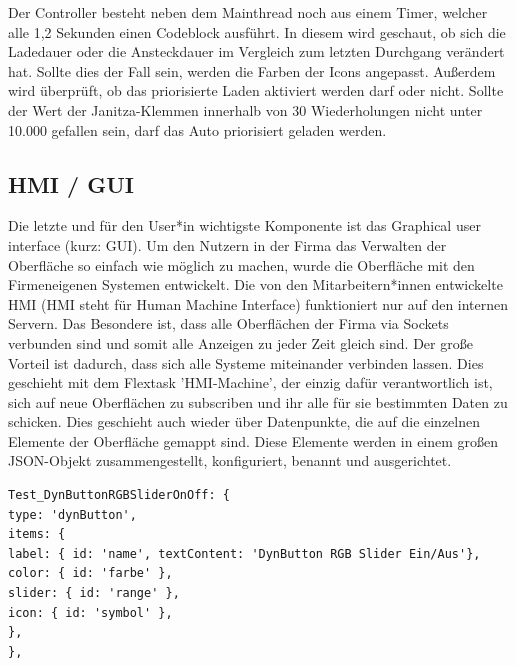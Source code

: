 Der Controller besteht neben dem Mainthread noch aus einem Timer, welcher alle 1,2 Sekunden einen Codeblock ausführt. In diesem wird geschaut, ob sich die Ladedauer oder die Ansteckdauer im Vergleich zum letzten Durchgang verändert hat. Sollte dies der Fall sein, werden die Farben der Icons angepasst. Außerdem wird überprüft, ob das priorisierte Laden aktiviert werden darf oder nicht. Sollte der Wert der Janitza-Klemmen innerhalb von 30 Wiederholungen nicht unter 10.000 gefallen sein, darf das Auto priorisiert geladen werden.


\subsection{HMI / GUI} 
Die letzte und für den User*in wichtigste Komponente ist das Graphical user interface (kurz: GUI). Um den Nutzern in der Firma das Verwalten der Oberfläche so einfach wie möglich zu machen, wurde die Oberfläche mit den Firmeneigenen Systemen entwickelt. Die von den Mitarbeitern*innen entwickelte HMI (HMI steht für Human Machine Interface) funktioniert nur auf den internen Servern. Das Besondere ist, dass alle Oberflächen der Firma via Sockets verbunden sind und somit alle Anzeigen zu jeder Zeit gleich sind. Der große Vorteil ist dadurch, dass sich alle Systeme miteinander verbinden lassen. Dies geschieht mit dem Flextask 'HMI-Machine', der einzig dafür verantwortlich ist, sich auf neue Oberflächen zu subscriben und ihr alle für sie bestimmten Daten zu schicken. Dies geschieht auch wieder über Datenpunkte, die auf die einzelnen Elemente der Oberfläche gemappt sind. Diese Elemente werden in einem großen JSON-Objekt zusammengestellt, konfiguriert, benannt und ausgerichtet.


\begin{lstlisting}[language=HTML,caption=Example Element,label=lst:impl:foo]
Test_DynButtonRGBSliderOnOff: {
type: 'dynButton',
items: {
label: { id: 'name', textContent: 'DynButton RGB Slider Ein/Aus'},
color: { id: 'farbe' },
slider: { id: 'range' },
icon: { id: 'symbol' },
},
},
\end{lstlisting}



